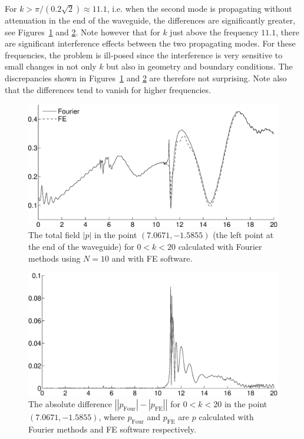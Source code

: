 \documentclass[numreferences]{kluwer}
\providecommand{\abs}[1]{\left\lvert#1\right\rvert}
\begin{document}
For $k>\pi/(0.2\sqrt2)\approx11.1$, i.e. when the second mode is
propagating without attenuation in the end of the waveguide, the
differences are significantly greater, see
Figures~\ref{fig:FEMvsFour2} and \ref{fig:totalfaltFEMFour}. Note
however that for $k$ just above the frequency $11.1$, there are
significant interference effects between the two
propagating modes. For these frequencies, the problem is ill-posed
since the interference is very sensitive to small changes
in not only $k$ but also in geometry and boundary conditions. The
discrepancies shown in Figures~\ref{fig:FEMvsFour2} and
\ref{fig:totalfaltFEMFour} are therefore not surprising. Note also
that the differences tend to vanish for higher frequencies.
\begin{figure}[htb]
  \centering
  \includegraphics[width=\linewidth]{totalfaltFEMvsFourier2}
  \caption{The total field $\abs p$ in the point $(7.0671,-1.5855)$
    (the left point at the end of the waveguide) for $0<k<20$
    calculated with Fourier methods using $N=10$ and with FE
    software.}
  \label{fig:FEMvsFour2}
\end{figure}
\begin{figure}[htb]
  \centering
  \includegraphics[width=\linewidth]{totalfaltFEM-Fourier}
  \caption{The absolute difference
    $\abs{\abs{p_{\text{Four}}}-\abs{p_{\text{FE}}}}$ for $0<k<20$ in the
    point $(7.0671,-1.5855)$, where $p_{\text{Four}}$ and
    $p_{\text{FE}}$ are $p$ calculated with Fourier methods and FE
    software respectively.}
  \label{fig:totalfaltFEMFour}
\end{figure}
\end{document}
